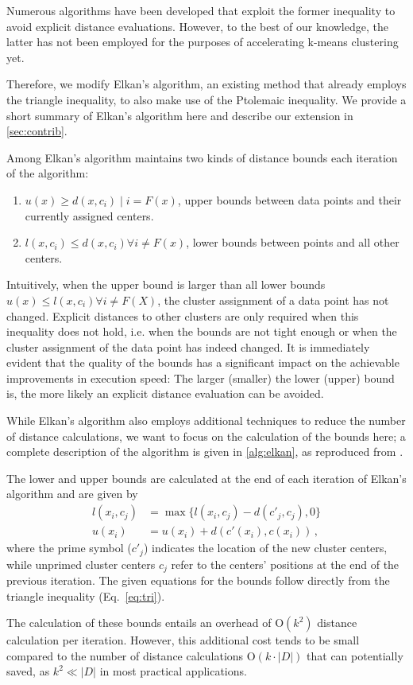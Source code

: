 Numerous algorithms have been developed that exploit the former inequality to avoid explicit distance evaluations. However, to the best of our knowledge, the latter has not been employed for the purposes of accelerating k-means clustering yet.

Therefore, we modify Elkan's algorithm, an existing method that already employs the triangle inequality, to also make use of the Ptolemaic inequality.
We provide a short summary of Elkan's algorithm \cite{DBLP:conf/icml/Elkan03} here and describe our extension in \autoref{sec:contrib}.

Among Elkan's algorithm maintains two kinds of distance bounds each iteration of the algorithm:
\begin{enumerate}[label=\roman*]
	\item $u(x) \geq d(x, c_i) \mid i = F(x)$,
	      upper bounds between data points and their currently assigned centers.
	\item $l(x, c_i) \leq d(x,c_i) \forall i \neq F(x)$,
	      lower bounds between points and all other centers.
\end{enumerate}
Intuitively, when the upper bound is larger than all lower bounds $u(x)\leq l(x,c_i) \forall i\neq F(X)$, the cluster assignment of a data point has not changed.
Explicit distances to other clusters are only required when this inequality does not hold, i.e. when the bounds are not tight enough or when the cluster assignment of the data point has indeed changed.
It is immediately evident that the quality of the bounds has a significant impact on the achievable improvements in execution speed:
The larger (smaller) the lower (upper) bound is, the more likely an explicit distance evaluation can be avoided.

While Elkan's algorithm also employs additional techniques to reduce the number of distance calculations, we want to focus on the calculation of the bounds here;
a complete description of the algorithm is given in \autoref{alg:elkan}, as reproduced from \cite{}.

The lower and upper bounds are calculated at the end of each iteration of Elkan's algorithm and are given by
\begin{align}
	\label{eq:elkan_lower}
	l(x_i, c_j) & = \max \{ l(x_i, c_j) - d(c'_j, c_j), 0 \} \\
	\label{eq:elkan_upper}
	u(x_i)      & = u(x_i) + d(c'(x_i), c(x_i)) \,,
\end{align}
where the prime symbol ($c'_j$) indicates the location of the new cluster centers, while unprimed cluster centers
$c_j$ refer to the centers' positions at the end of the previous iteration.
The given equations for the bounds follow directly from the triangle inequality (Eq.~\ref{eq:tri}).

The calculation of these bounds entails an overhead of $\mathrm{O}(k^2)$ distance calculation per iteration.
However, this additional cost tends to be small compared to the number of distance calculations $\mathrm{O}(k\cdot|D|)$ that can potentially saved,
as  $k^2 \ll |D|$ in most practical applications.


